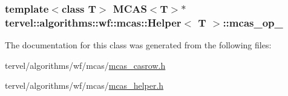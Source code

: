 \subsubsection[{mcas\+\_\+op\+\_\+}]{\setlength{\rightskip}{0pt plus 5cm}template$<$class T$>$ {\bf M\+C\+A\+S}$<$T$>$$\ast$ {\bf tervel\+::algorithms\+::wf\+::mcas\+::\+Helper}$<$ T $>$\+::mcas\+\_\+op\+\_\+\hspace{0.3cm}{\ttfamily [private]}}\label{classtervel_1_1algorithms_1_1wf_1_1mcas_1_1_helper_a50a2eb6601553b9110c408f7981b7f15}


The documentation for this class was generated from the following files\+:\begin{DoxyCompactItemize}
\item 
tervel/algorithms/wf/mcas/\hyperlink{mcas__casrow_8h}{mcas\+\_\+casrow.\+h}\item 
tervel/algorithms/wf/mcas/\hyperlink{mcas__helper_8h}{mcas\+\_\+helper.\+h}\end{DoxyCompactItemize}
